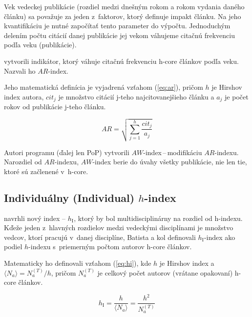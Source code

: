 Vek vedeckej publikácie (rozdiel medzi dnešným rokom a rokom vydania daného
článku) sa považuje za jeden z~faktorov, ktorý definuje impakt článku.  Na jeho
kvantifikáciu je nutné započítať tento parameter do výpočtu.  Jednoduchým
delením počtu citácií danej publikácie jej vekom váhujeme citačnú frekvenciu
podľa veku (publikácie).

\citet{Jin2007} vytvorili indikátor, ktorý váhuje citačnú frekvenciu h-core
článkov podľa veku.  Nazvali ho $\mathit{AR}$-index.

Jeho matematická definícia je vyjadrená vzťahom (\ref{eq:ar}), pričom $h$ je
Hirshov index autora, $\mathit{cit}_j$ je množstvo citácií j-teho
najcitovanejšieho článku a $a_j$ je počet rokov od publikácie j-teho článku.

\begin{equation}
\label{eq:ar}
\mathit{AR} = \sqrt{\sum_{j=1}^h{\frac{\mathit{cit}_j}{a_j}}}
\end{equation}

Autori programu  (ďalej len PoP)
 vytvorili
$\mathit{AW}$-index\,--\,modifikáciu $\mathit{AR}$-indexu.  Narozdiel od
$\mathit{AR}$-indexu, $\mathit{AW}$-index berie do úvahy všetky publikácie, nie
len tie, ktoré sú začlenené v~h-core.


\subsection{Individuálny (Individual) $h$-index}

\citet{Batista2006} navrhli nový index -- $h_{\mathrm{I}}$, ktorý by bol
multidisciplinárny na rozdiel od h-indexu.  Kďeže jeden z~hlavných rozdielov
medzi vedeckými disciplínami je množstvo vedcov, ktorí pracujú v~danej
disciplíne, Batista a kol definovali $h_{\mathrm{I}}$-index ako podiel
$h$-indexu s~priemerným počtom autorov h-core článkov.

Matematicky ho definovali vzťahom (\ref{eq:hi}), kde $h$ je Hirshov index a
$\langle N_a \rangle = N_a^{(T)} / h$, pričom $N_a^{(T)}$ je celkový počet
autorov (vrátane opakovaní) h-core článkov.

\begin{equation}
\label{eq:hi}
h_{\mathrm{I}} = \frac{h}{\langle N_a \rangle} = \frac{h^2}{N_a^{(T)}}
\end{equation}



